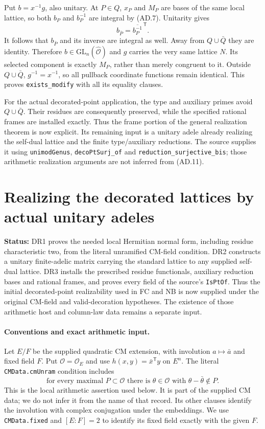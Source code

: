 \documentclass[11pt,a4paper]{article}
\numberwithin{equation}{section}
\theoremstyle{remark}\newtheorem{remark}[theorem]{Remark}
\newcommand{\status}[1]{\textbf{Status:} #1}
\begin{document}
Put $b=x^{-1}g$, also unitary. At $P\in Q$, $x_P$ and
$M_P$ are bases of the same local lattice, so both $b_P$
and $b_P^{-1}$ are integral by (AD.7). Unitarity gives
\[
            b_{\bar P}=\overline{b_P^{-1}}^{\,\mathsf T}.
                                                               \tag{AD.12}
\]
It follows that $b_{\bar P}$ and its inverse are integral
as well. Away from $Q\cup\bar Q$ they are identity.
Therefore $b\in\mathrm{GL}_n(\widehat{\mathcal O})$ and
$g$ carries the very same lattice $N$. Its selected component
is exactly $M_P$, rather than merely congruent to it.
Outside $Q\cup\bar Q$, $g^{-1}=x^{-1}$, so all pullback
coordinate functions remain identical. This proves
\texttt{exists\_\allowbreak modify} with all its equality clauses.

For the actual decorated-point application, the type and auxiliary
primes avoid $Q\cup\bar Q$. Their residues are consequently
preserved, while the specified rational frames are installed
exactly. Thus the frame portion of the general realization
theorem is now explicit. Its remaining input is a unitary
adele already realizing the self-dual lattice and the finite
type/auxiliary reductions. The source supplies it using
\texttt{unimodGenus}, \texttt{decoPtSurj\_\allowbreak of} and
\texttt{reduction\_\allowbreak surjective\_\allowbreak bis}; those arithmetic
realization arguments are not inferred from (AD.11).


\section{Realizing the decorated lattices by actual unitary adeles}
\label{sec:decorated-realization}

\status{DR1 proves the needed local Hermitian normal form, including
residue characteristic two, from the literal unramified CM-field
condition. DR2 constructs a unitary finite-adelic matrix carrying the
standard lattice to any supplied self-dual lattice. DR3 installs the
prescribed residue functionals, auxiliary reduction bases and rational
frames, and proves every field of the source's \texttt{IsPtOf}.
Thus the initial decorated-point realizability used in FC and NB is
now supplied under the original CM-field and valid-decoration hypotheses.
The existence of those arithmetic host and column-law data remains a
separate input.}

\paragraph{Conventions and exact arithmetic input.}
Let $E/F$ be the supplied quadratic CM extension, with involution
$a\mapsto\bar a$ and fixed field $F$. Put $\mathcal O=\mathcal O_E$
and use $h(x,y)=\bar x^{\mathsf T}y$ on $E^n$.
The literal \texttt{CMData.cmUnram} condition includes
\[
 \text{for every maximal }P\subset\mathcal O\text{ there is }
 \theta\in\mathcal O\text{ with }\theta-\bar\theta\notin P.
 \tag{DR.1}
\]
This is the local arithmetic assertion used below. It is part of the
supplied CM data; we do not infer it from the name of that record.
Its other clauses identify the involution with complex conjugation
under the embeddings. We use \texttt{CMData.fixed} and
$[E:F]=2$ to identify its fixed field exactly with the given $F$.
\end{document}
